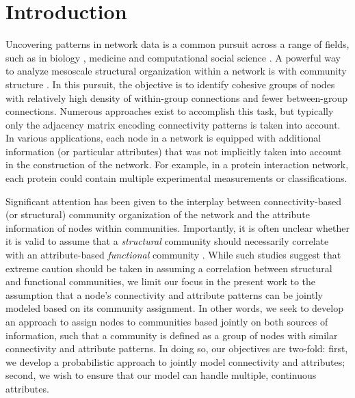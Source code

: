 \documentclass[10pt,journal,compsoc]{IEEEtran}
\begin{document}
\maketitle

\section{Introduction}

Uncovering patterns in network data is a common pursuit across a range of fields, such as in biology \cite{dan}, medicine \cite{agha,cancer} and computational social science \cite{socialnetwork}. A powerful way to analyze mesoscale structural organization within a network is with community structure \cite{muchacommunity,jurecommunity,shaiCC,fortu1,fortu2}. In this pursuit, the objective is to identify cohesive groups of nodes with relatively high density of within-group connections and fewer between-group connections. Numerous approaches exist to accomplish this task, but typically only the adjacency matrix encoding connectivity patterns is taken into account. In various applications, each node in a network is equipped with additional information (or particular attributes) that was not implicitly taken into account in the construction of the network. For example, in a protein interaction network, each protein could contain multiple experimental measurements or classifications. 

Significant attention has been given to the interplay between connectivity-based (or structural) community organization of the network and the attribute information of nodes within communities. Importantly, it is often unclear whether it is valid to assume that a \emph{structural} community should necessarily correlate with an attribute-based \emph{functional} community \cite{hric,peel2017ground,jureGroundTruth}. While such studies suggest that extreme caution should be taken in assuming a correlation between structural and functional communities, we limit our focus in the present work to the assumption that a node's connectivity and attribute patterns can be jointly modeled based on its community assignment. In other words, we seek to develop an approach to assign nodes to communities based jointly on both sources of information, such that a community is defined as a group of nodes with similar connectivity and attribute patterns. In doing so, our objectives are two-fold: first, we develop a probabilistic approach to jointly model connectivity and attributes; second, we wish to ensure that our model can handle multiple, continuous attributes.  
\end{document}
